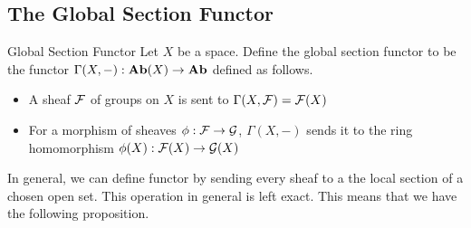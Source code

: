 \documentclass[a4paper]{article}
\begin{document}
\subsection{The Global Section Functor}
\begin{defn}{Global Section Functor}{} Let $X$ be a space. Define the global section functor to be the functor $\Gamma(X,-):\bold{Ab}(X)\to\bold{Ab}$ defined as follows. 
\begin{itemize}
\item A sheaf $\mathcal{F}$ of groups on $X$ is sent to $\Gamma(X,\mathcal{F})=\mathcal{F}(X)$
\item For a morphism of sheaves $\phi:\mathcal{F}\to\mathcal{G}$, $\Gamma(X,-)$ sends it to the ring homomorphism $\phi(X):\mathcal{F}(X)\to\mathcal{G}(X)$
\end{itemize}
\end{defn}

In general, we can define functor by sending every sheaf to a the local section of a chosen open set. This operation in general is left exact. This means that we have the following proposition. 
\end{document}
